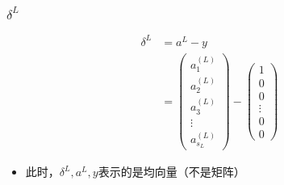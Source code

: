 \subsubsection{$\delta^{L}$}
\begin{equation}\begin{aligned}
	\delta^{L} &= a^{L} - y \\
		&= \left(\begin{matrix}
			a_1^{(L)} \\ a_2^{(L)} \\ a_3^{(L)} \\ \vdots \\ a_{s_L}^{(L)}
		\end{matrix}\right) - 
		\left(\begin{matrix}
	        1 \\ 0 \\ 0 \\ \vdots \\ 0 \\ 0 
		\end{matrix}\right)
\end{aligned}\end{equation}
\begin{itemize}
	\item 此时，$\delta^{L}, a^{L}, y$表示的是均向量（不是矩阵）
\end{itemize}

